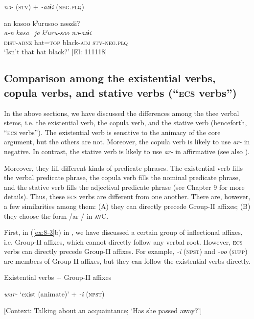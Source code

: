 \ex \textit{nə-} (\textsc{stv}) + \textit{-azɨi} (\textsc{neg}.\textsc{plq})

{\TM}
\glll  an  kasoo  kˀurusoo  nəəzɨi?\\
\textit{a-n}  \textit{kasa=ja}  \textit{kˀuru-soo}  \textit{nə-azɨi}\\
\textsc{dist}-\textsc{adnz}  hat=\textsc{top}  black-\textsc{adj}  \textsc{stv}-\textsc{neg}.\textsc{plq}\\
\glt ‘Isn’t that hat black?’ [El: 111118]
\z
\z

\subsection{Comparison among the existential verbs, copula verbs, and stative verbs (“\textsc{ecs} verbs”)}

In the above sections, we have discussed the differences among the thee verbal stems, i.e. the existential verb, the copula verb, and the stative verb (henceforth, “\textsc{ecs} verbs”). The existential verb is sensitive to the animacy of the core argument, but the others are not. Moreover, the copula verb is likely to use \textit{ar-} in negative. In contrast, the stative verb is likely to use \textit{ar-} in affirmative (see also ).

Moreover, they fill different kinds of predicate phrases. The existential verb fills the verbal predicate phrase, the copula verb fills the nominal predicate phrase, and the stative verb fills the adjectival predicate phrase (see Chapter 9 for more details). Thus, these \textsc{ecs} verbs are different from one another. There are, however, a few similarities among them: (A) they can directly precede Group-II affixes; (B) they choose the form /ar-/ in \textsc{av}C.

  First, in (\ref{ex:8-3}b) in , we have discussed a certain group of inflectional affixes, i.e. Group-II affixes, which cannot directly follow any verbal root. However, \textsc{ecs} verbs can directly precede Group-II affixes. For example, \textit{-i} (\textsc{npst}) and \textit{-oo} (\textsc{supp}) are members of Group-II affixes, but they can follow the existential verbs directly.

\ea\label{ex:8-50}
  Existential verbs + Group-II affixes

\ea \textit{wur-} ‘exist (animate)’ + \textit{-i} (\textsc{npst})

    [Context: Talking about an acquaintance;
    {\US}
  ‘Has she passed away?’]\\

